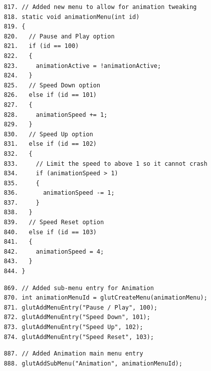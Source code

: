 \documentclass{article}
\begin{document}
\begin{commandline}
	\begin{verbatim}
	817. // Added new menu to allow for animation tweaking
	818. static void animationMenu(int id)
	819. {
	820.   // Pause and Play option
	821.   if (id == 100)
	822.   {
	823.     animationActive = !animationActive;
	824.   }
	825.   // Speed Down option
	826.   else if (id == 101)
	827.   {
	828.     animationSpeed += 1;
	829.   }
	830.   // Speed Up option
	831.   else if (id == 102)
	832.   {
	833.     // Limit the speed to above 1 so it cannot crash
	834.     if (animationSpeed > 1)
	835.     {
	836.       animationSpeed -= 1;
	837.     }
	838.   }
	839.   // Speed Reset option
	840.   else if (id == 103)
	841.   {  
	842.     animationSpeed = 4;
	843.   }
	844. }
	\end{verbatim}
\end{commandline}

\begin{commandline}
	\begin{verbatim}
	869. // Added sub-menu entry for Animation
	870. int animationMenuId = glutCreateMenu(animationMenu);
	871. glutAddMenuEntry("Pause / Play", 100);
	872. glutAddMenuEntry("Speed Down", 101);
	873. glutAddMenuEntry("Speed Up", 102);
	874. glutAddMenuEntry("Speed Reset", 103);
	\end{verbatim}
\end{commandline}

\begin{commandline}
	\begin{verbatim}
	887. // Added Animation main menu entry
	888. glutAddSubMenu("Animation", animationMenuId);
	\end{verbatim}
\end{commandline}


\end{document}
